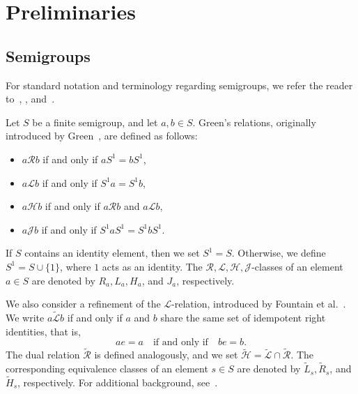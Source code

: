 \documentclass[11pt,reqno]{amsart}
\theoremstyle{plain}
\theoremstyle{remark}
\theoremstyle{definition}
\begin{document}

\section{Preliminaries}\label{Prelim}
\subsection{Semigroups}

For standard notation and terminology regarding semigroups, we refer the reader to~\cite[Chap.~5]{Alm}, \cite[Chaps.~1--3]{Cli-Pre}, and~\cite[Appendix~A]{Rho-Ste}.

Let \( S \) be a finite semigroup, and let \( a, b \in S \). Green’s relations, originally introduced by Green~\cite{Gre}, are defined as follows:
\begin{itemize}
    \item \( a \mathrel{\mathcal{R}} b \) if and only if \( aS^1 = bS^1 \),
    \item \( a \mathrel{\mathcal{L}} b \) if and only if \( S^1a = S^1b \),
    \item \( a \mathrel{\mathcal{H}} b \) if and only if \( a \mathrel{\mathcal{R}} b \) and \( a \mathrel{\mathcal{L}} b \),
    \item \( a \mathrel{\mathcal{J}} b \) if and only if \( S^1aS^1 = S^1bS^1 \).
\end{itemize}
If \( S \) contains an identity element, then we set \( S^1 = S \). Otherwise, we define \( S^1 = S \cup \{1\} \), where \( 1 \) acts as an identity. 
The \( \mathcal{R}, \mathcal{L}, \mathcal{H}, \mathcal{J} \)-classes of an element \( a \in S \) are denoted by \( R_a, L_a, H_a \), and \( J_a \), respectively.

We also consider a refinement of the \( \mathcal{L} \)-relation, introduced by Fountain et al.~\cite{Fou-Gom-Gou}. We write \( a \mathrel{\widetilde{\mathcal{L}}} b \) if and only if \( a \) and \( b \) share the same set of idempotent right identities, that is,
\[
ae = a \quad \text{if and only if} \quad be = b.
\]
The dual relation \( \widetilde{\mathcal{R}} \) is defined analogously, and we set \( \widetilde{\mathcal{H}} = \widetilde{\mathcal{L}} \cap \widetilde{\mathcal{R}} \). The corresponding equivalence classes of an element \( s \in S \) are denoted by \( \widetilde{L}_s, \widetilde{R}_s \), and \( \widetilde{H}_s \), respectively. For additional background, see~\cite{Lawson-Sem-Cat}.
\end{document}
